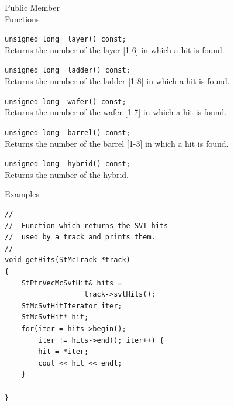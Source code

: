 \begin{Entry}
\item[Public Member\\ Functions]

    \verb+unsigned long  layer() const;+\\
    Returns the number of the layer [1-6] in which a hit is found. 

    \verb+unsigned long  ladder() const;+\\
    Returns the number of the ladder [1-8] in which a hit is found. 

    \verb+unsigned long  wafer() const;+\\
    Returns the number of the wafer [1-7] in which a hit is found. 

    \verb+unsigned long  barrel() const;+\\
    Returns the number of the barrel [1-3] in which a hit is found. 

    \verb+unsigned long  hybrid() const;+\\
    Returns the number of the hybrid.

\item[Examples]
{\footnotesize
\begin{verbatim}
//
//  Function which returns the SVT hits
//  used by a track and prints them.
//
void getHits(StMcTrack *track)
{
    StPtrVecMcSvtHit& hits =
                   track->svtHits();
    StMcSvtHitIterator iter;
    StMcSvtHit* hit;
    for(iter = hits->begin();
        iter != hits->end(); iter++) {
        hit = *iter;
        cout << hit << endl;
    }
    
}
\end{verbatim}
}%
\end{Entry}
\clearpage
%
%
